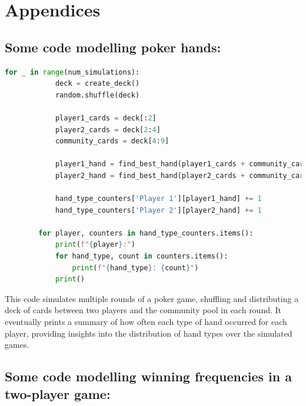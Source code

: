 \documentclass{article}
\begin{document}
\newpage
\section*{Appendices}

\subsection*{Some code modelling poker hands:}

\begin{center}
    \begin{lstlisting}[language=Python]
        for _ in range(num_simulations):
            deck = create_deck()
            random.shuffle(deck)
            
            player1_cards = deck[:2]
            player2_cards = deck[2:4]
            community_cards = deck[4:9]
            
            player1_hand = find_best_hand(player1_cards + community_cards)
            player2_hand = find_best_hand(player2_cards + community_cards)
            
            hand_type_counters['Player 1'][player1_hand] += 1
            hand_type_counters['Player 2'][player2_hand] += 1

        for player, counters in hand_type_counters.items():
            print(f"{player}:")
            for hand_type, count in counters.items():
                print(f"{hand_type}: {count}")
            print()
        \end{lstlisting}
\end{center}

This code simulates multiple rounds of a poker game, shuffling and 
distributing a deck of cards between two players and the community 
pool in each round. It eventually prints a summary of how often 
each type of hand occurred for each player, providing insights into 
the distribution of hand types over the simulated games.

\subsection*{Some code modelling winning frequencies in a two-player game:}
\end{document}
